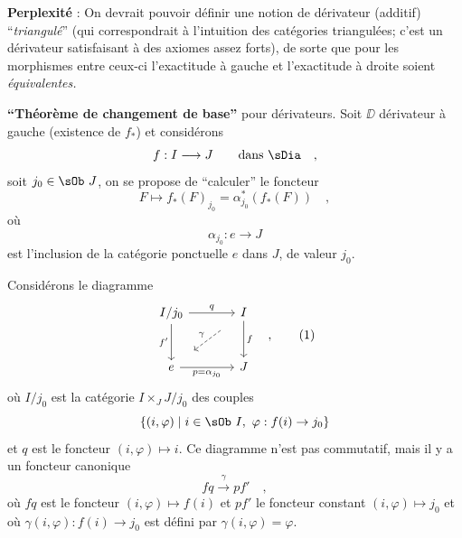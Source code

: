 \textbf{Perplexité} : On devrait pouvoir définir une notion de dérivateur (additif) “\textit{triangulé}” (qui correspondrait à l'intuition des catégories triangulées; c'est un dérivateur satisfaisant à des axiomes assez forts), de sorte que pour les morphismes entre ceux-ci l'exactitude à gauche et l'exactitude à droite soient \textit{équivalentes.}

\textbf{“Théorème de changement de base”} pour dérivateurs. Soit $\DD$ dérivateur à gauche (existence de $f_*$) et considérons
\[ f : I \longrightarrow J \qquad \text{dans } \sDia \quad , \]
soit $j_0 \in \sOb\ J$, on se propose de “calculer” le foncteur
\[ F \mapsto f_*(F)_{j_0} = \alpha^*_{j_0}(f_*(F)) \quad , \]
où
\[ \alpha_{j_0} : e \longrightarrow J \]
est l'inclusion de la catégorie ponctuelle $e$ dans $J$, de valeur $j_0$.

Considérons le diagramme
\[
\begin{tikzcd}[row sep=large, column sep=large]
I/j_0 \arrow[r, "q"] \arrow[d, "f'"'] & I \arrow[d, "f"] \\
e \arrow[r, "p = \alpha_{j_0}"'] & J
\arrow[from=1-2, to=2-1, dashed, shorten <=14pt, shorten >=14pt, "\gamma"']
\end{tikzcd}
\quad ,
\tag*{(1)}
\]
où $I/j_0$ est la catégorie $I \times_J J/j_0$ des couples
\[ \{(i,\varphi) \mid i \in \sOb\ I,\ \varphi : f(i) \to j_0\} \]
et $q$ est le foncteur $(i,\varphi) \mapsto i$. Ce diagramme n'est pas commutatif, mais il y a un foncteur canonique
\[ fq \xrightarrow{\gamma} pf' \quad , \]
où $fq$ est le foncteur $(i,\varphi) \mapsto f(i)$ et $pf'$ le foncteur constant $(i,\varphi) \mapsto j_0$ et où $\gamma(i,\varphi) : f(i) \to j_0$ est défini par $\gamma(i,\varphi) = \varphi$.

